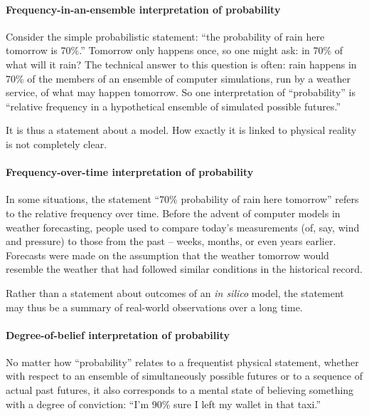 \documentclass[a4paper, 12pt]{article}
\newcommand{\ie}{{\it i.e.}\ }
\begin{document}

\paragraph{Frequency-in-an-ensemble interpretation of probability\\}
Consider the simple pro\-babilistic statement: ``the probability of rain here tomorrow is 70\%.'' Tomorrow only happens once, so one might ask: in 70\% of what will it rain? The technical answer to this question is often: rain happens in 70\% of the members of an ensemble of computer simulations, run by a weather service, of what may happen tomorrow. So one interpretation of ``probability'' is ``relative frequency in a hypothetical ensemble of simulated possible futures.'' 

It is thus a statement about a model. How exactly it is linked to physical reality is not completely clear. 


\paragraph{Frequency-over-time interpretation of probability\\}
In some situations, the statement ``70\% probability of rain here tomorrow'' refers to the relative frequency over time. Before the advent of computer models in weather forecasting, people used to compare today's measurements (of, say, wind and pressure) to those from the past -- weeks, months, or even years earlier. Forecasts were made on the assumption that the weather tomorrow would resemble the weather that had followed similar conditions in the historical record.

Rather than a statement about outcomes of an {\it in silico} model, the statement may thus be a summary of real-world observations over a long time.

\paragraph{Degree-of-belief interpretation of probability\\}
No matter how ``probability'' relates to a frequentist physical statement, whether with respect to an ensemble of simultaneously possible futures or to a sequence of actual past futures, it also corresponds to a mental state of believing something with a degree of conviction: ``I'm 90\% sure I left my wallet in that taxi.''
\end{document}
